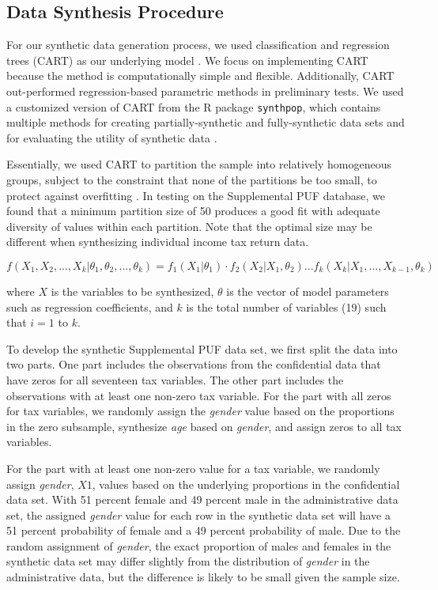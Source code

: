 \documentclass[11pt,runningheads,oribibl]{llncs}
\begin{document}
\subsection{Data Synthesis Procedure}
For our synthetic data generation process, we used classification and regression trees (CART) as our underlying model \citep{breiman1984classification,reiter2005using}. We focus on implementing CART because the method is computationally simple and flexible. Additionally, CART out-performed regression-based parametric methods in preliminary tests. We used a customized version of CART from the R package \verb;synthpop;, which contains multiple methods for creating partially-synthetic and fully-synthetic data sets and for evaluating the utility of synthetic data \citep{nowok2019package}. 

Essentially, we used CART to partition the sample into relatively homogeneous groups, subject to the constraint that none of the partitions be too small, to protect against overfitting \citep{benedetto2013creation}. In testing on the Supplemental PUF database, we found that a minimum partition size of 50 produces a good fit with adequate diversity of values within each partition. Note that the optimal size may be different when synthesizing individual income tax return data. 

\begin{dmath}
    f(X_1,X_2,...,X_k|\theta_1,\theta_2,...,\theta_k) = f_1 (X_1|\theta_1)\cdot f_2(X_2|X_1,\theta_2)...
    f_k(X_k|X_1,...,X_{k-1},\theta_k)
\end{dmath}

\noindent where $X$ is the variables to be synthesized, $\theta$ is the vector of model parameters such as regression coefficients, and $k$ is the total number of variables (19) such that $i = 1$ to $k$.

To develop the synthetic Supplemental PUF data set, we first split the data into two parts. One part includes the observations from the confidential data that have zeros for all seventeen tax variables. The other part includes the observations with at least one non-zero tax variable. For the part with all zeros for tax variables, we randomly assign the \textit{gender} value based on the proportions in the zero subsample, synthesize \textit{age} based on \textit{gender}, and assign zeros to all tax variables. 

For the part with at least one non-zero value for a tax variable, we randomly assign \textit{gender}, $X1$, values based on the underlying proportions in the confidential data set. With 51 percent female and 49 percent male in the administrative data set, the assigned \textit{gender} value for each row in the synthetic data set will have a 51 percent probability of female and a 49 percent probability of male. Due to the random assignment of \textit{gender}, the exact proportion of males and females in the synthetic data set may differ slightly from the distribution of \textit{gender} in the administrative data, but the difference is likely to be small given the sample size. 
\end{document}
